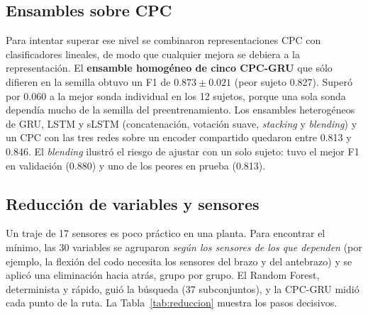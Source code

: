 \documentclass[letterpaper,11pt]{article}
\begin{document}
\subsection{Ensambles sobre CPC}
\label{sec:ensambles}
Para intentar superar ese nivel se combinaron representaciones CPC con clasificadores lineales, de modo que cualquier mejora se debiera a la representación. El \textbf{ensamble homogéneo de cinco CPC-GRU} que sólo difieren en la semilla obtuvo un F1 de $0.873 \pm 0.021$ (peor sujeto 0.827). Superó por 0.060 a la mejor sonda individual en los 12 sujetos, porque una sola sonda dependía mucho de la semilla del preentrenamiento. Los ensambles heterogéneos de GRU, LSTM y sLSTM (concatenación, votación suave, \emph{stacking} y \emph{blending}) y un CPC con las tres redes sobre un encoder compartido quedaron entre 0.813 y 0.846. El \emph{blending} ilustró el riesgo de ajustar con un solo sujeto: tuvo el mejor F1 en validación (0.880) y uno de los peores en prueba (0.813).

\subsection{Reducción de variables y sensores}
\label{sec:reduccion}
Un traje de 17 sensores es poco práctico en una planta. Para encontrar el mínimo, las 30 variables se agruparon \emph{según los sensores de los que dependen} (por ejemplo, la flexión del codo necesita los sensores del brazo y del antebrazo) y se aplicó una eliminación hacia atrás, grupo por grupo. El Random Forest, determinista y rápido, guió la búsqueda (37 subconjuntos), y la CPC-GRU midió cada punto de la ruta. La Tabla~\ref{tab:reduccion} muestra los pasos decisivos.
\end{document}

